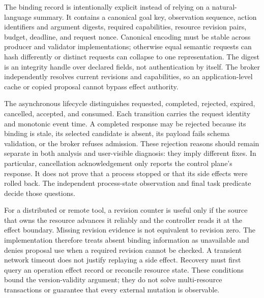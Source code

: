 \documentclass[11pt]{article}
\begin{document}
The binding record is intentionally explicit instead of relying on a natural-language summary. It contains a canonical goal key, observation sequence, action identifiers and argument digests, required capabilities, resource revision pairs, budget, deadline, and request nonce. Canonical encoding must be stable across producer and validator implementations; otherwise equal semantic requests can hash differently or distinct requests can collapse to one representation. The digest is an integrity handle over declared fields, not authentication by itself. The broker independently resolves current revisions and capabilities, so an application-level cache or copied proposal cannot bypass effect authority.

The asynchronous lifecycle distinguishes requested, completed, rejected, expired, cancelled, accepted, and consumed. Each transition carries the request identity and monotonic event time. A completed response may be rejected because its binding is stale, its selected candidate is absent, its payload fails schema validation, or the broker refuses admission. These rejection reasons should remain separate in both analysis and user-visible diagnosis: they imply different fixes. In particular, cancellation acknowledgement only reports the control plane's response. It does not prove that a process stopped or that its side effects were rolled back. The independent process-state observation and final task predicate decide those questions.

For a distributed or remote tool, a revision counter is useful only if the source that owns the resource advances it reliably and the controller reads it at the effect boundary. Missing revision evidence is not equivalent to revision zero. The implementation therefore treats absent binding information as unavailable and denies proposal use when a required revision cannot be checked. A transient network timeout does not justify replaying a side effect. Recovery must first query an operation effect record or reconcile resource state. These conditions bound the version-validity argument; they do not solve multi-resource transactions or guarantee that every external mutation is observable.
\end{document}
